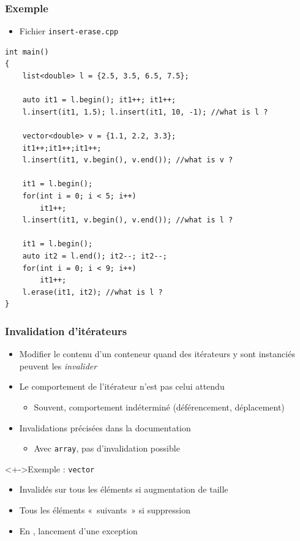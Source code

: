 \begin{frame}[containsverbatim]
\frametitle{Exemple}
\begin{itemize}
\item Fichier \texttt{insert-erase.cpp}
\end{itemize}
\begin{lstlisting}
int main()
{
	list<double> l = {2.5, 3.5, 6.5, 7.5};

	auto it1 = l.begin(); it1++; it1++;
	l.insert(it1, 1.5); l.insert(it1, 10, -1); //what is l ?

	vector<double> v = {1.1, 2.2, 3.3};
	it1++;it1++;it1++;
	l.insert(it1, v.begin(), v.end()); //what is v ?

	it1 = l.begin();
	for(int i = 0; i < 5; i++)
		it1++;
	l.insert(it1, v.begin(), v.end()); //what is l ?

	it1 = l.begin();
	auto it2 = l.end(); it2--; it2--;
	for(int i = 0; i < 9; i++)
		it1++;
	l.erase(it1, it2); //what is l ?
}
\end{lstlisting}
\end{frame}

\begin{frame}
\frametitle{Invalidation d'itérateurs}
\begin{itemize}[<+->]
\item Modifier le contenu d'un conteneur quand des itérateurs y sont instanciés peuvent les \emph{invalider}
\item Le comportement de l'itérateur n'est pas celui attendu
	\begin{itemize}
	\item Souvent, comportement indéterminé (déférencement, déplacement)
	\end{itemize}
\item Invalidations précisées dans la documentation
	\begin{itemize}
	\item Avec \texttt{array}, pas d'invalidation possible
	\end{itemize}
\end{itemize}
\begin{exampleblock}<+->{Exemple : \texttt{vector}}
	\begin{itemize}[<+->]
	\item Invalidés sur tous les éléments si augmentation de taille
	\item Tous les éléments «~suivants~» si suppression
	\end{itemize}
\end{exampleblock}
\begin{itemize}[<+->]
\item En \java, lancement d'une exception
\end{itemize}
\end{frame}

